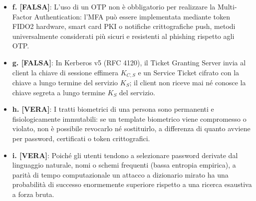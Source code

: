 \documentclass[11pt,a4paper]{article}
\begin{document}
\begin{solutionbox}
\begin{itemize}
    \item \textbf{f. [FALSA]}: L'uso di un OTP non è obbligatorio per realizzare la Multi-Factor Authentication: l'MFA può essere implementata mediante token FIDO2 hardware, smart card PKI o notifiche crittografiche push, metodi universalmente considerati più sicuri e resistenti al phishing rispetto agli OTP.
    \item \textbf{g. [FALSA]}: In Kerberos v5 (RFC 4120), il Ticket Granting Server invia al client la chiave di sessione effimera $K_{C,S}$ e un Service Ticket cifrato con la chiave a lungo termine del servizio $K_S$; il client non riceve mai né conosce la chiave segreta a lungo termine $K_S$ del servizio.
    \item \textbf{h. [VERA]}: I tratti biometrici di una persona sono permanenti e fisiologicamente immutabili: se un template biometrico viene compromesso o violato, non è possibile revocarlo né sostituirlo, a differenza di quanto avviene per password, certificati o token crittografici.
    \item \textbf{i. [VERA]}: Poiché gli utenti tendono a selezionare password derivate dal linguaggio naturale, nomi o schemi frequenti (bassa entropia empirica), a parità di tempo computazionale un attacco a dizionario mirato ha una probabilità di successo enormemente superiore rispetto a una ricerca esaustiva a forza bruta.
\end{itemize}
\end{solutionbox}
\end{document}
